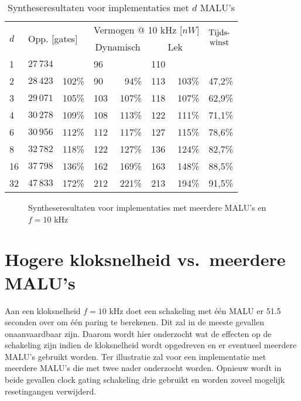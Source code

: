 \begin{table}[h]
	\caption{Syntheseresultaten voor implementaties met $d$ MALU's}
	\label{tabel-resultaten-md}

	\centering
	\begin{tabular}{llrlrlrl}
		\toprule
		\multirow{2}{*}{$d$} & \multicolumn{2}{l}{\multirow{2}{*}{Opp. [gates]}}	& \multicolumn{4}{c}{Vermogen @ 10 kHz [$nW$]}	& \multirow{2}{*}{$\begin{array}{@{}c@{}}\text{Tijds-}\\\text{winst}\end{array}$}\\
		\cmidrule{4-7}
		&	& & \multicolumn{2}{c}{Dynamisch}	& \multicolumn{2}{c}{Lek}	&\\
		\midrule
		1			& $27\,734$	& 			& 96	& 			& 110	& 			& \\
		2			& $28\,423$	& 102\%	& 90	& 94\%	& 113	& 103\%	& 47,2\%\\
		3			& $29\,071$	& 105\%	& 103	& 107\%	& 118	& 107\%	& 62,9\%\\
		4			& $30\,278$	& 109\%	& 108	& 113\%	& 122	& 111\%	& 71,1\%\\
		6			& $30\,956$	& 112\%	& 112	& 117\%	& 127	& 115\%	& 78,6\%\\
		8			& $32\,782$	& 118\%	& 122	& 127\%	& 136	& 124\%	& 82,7\%\\
		16			& $37\,798$	& 136\%	& 162	& 169\%	& 163	& 148\%	& 88,5\%\\
		32			& $47\,833$	& 172\%	& 212	& 221\%	& 213	& 194\%	& 91,5\%\\
		\hline		
	\end{tabular}
\end{table}

\begin{figure}[h]
	\centering
		\caption{Syntheseresultaten voor implementaties met meerdere MALU's en $f = 10$ kHz\label{figuur-resultaten-md}}
\end{figure}

\section{Hogere kloksnelheid vs.\ meerdere MALU's}

Aan een kloksnelheid $f = 10$ kHz doet een schakeling met \'e\'en MALU er 51.5 seconden over om \'e\'en paring te berekenen. Dit zal  in de meeste gevallen onaanvaardbaar zijn. Daarom wordt hier onderzocht wat de effecten op de schakeling zijn indien de kloksnelheid wordt opgedreven en er eventueel meerdere MALU's gebruikt worden. Ter illustratie zal voor een implementatie met meerdere MALU's die met twee nader onderzocht worden. Opnieuw wordt in beide gevallen clock gating schakeling drie gebruikt en worden zoveel mogelijk resetingangen verwijderd.

